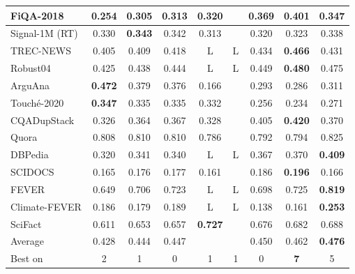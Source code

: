 \documentclass{article}
\begin{document}
\begin{table*}[t!]
{\begin{tabular}{l | c | c c | c c c c | c }
    FiQA-2018 & 0.254 
    & 0.305 & 0.313
    & 0.320 & & 0.369 & \textbf{0.401}
    & 0.347 \\ \midrule
   
    Signal-1M (RT) & 0.330
    & \textbf{0.343} & 0.342
    & 0.313 &  & 0.320 & 0.323
    & 0.338 \\ \midrule
    
    TREC-NEWS & 0.405
    & 0.409 & 0.418
    & L & L & 0.434 & \textbf{0.466}
    & 0.431 \\
    
    Robust04 & 0.425
    & 0.438 & 0.444
    & L & L & 0.449 & \textbf{0.480}
    & 0.475 \\ \midrule
    
    ArguAna & \textbf{0.472}
    & 0.379 & 0.376
    & 0.166 & & 0.293 & 0.286
    & 0.311 \\  
    
    Touché-2020 & \textbf{0.347}
    & 0.335 & 0.335
    & 0.332 & & 0.256 & 0.234
    & 0.271 \\ \midrule 
    
    CQADupStack & 0.326 
    & 0.364 & 0.367
    & 0.328 & & 0.405 & \textbf{0.420}
    & 0.370 \\
   
    Quora & 0.808
    & 0.810 & 0.810
    & 0.786 & & 0.792 & 0.794
    & 0.825 \\ \midrule
    
    DBPedia & 0.320
    & 0.341 & 0.340
    & L & L & 0.367 & 0.370
    & \textbf{0.409} \\ \midrule
   
    SCIDOCS & 0.165
    & 0.176 & 0.177
    & 0.161 & & 0.186 & \textbf{0.196}
    & 0.166 \\ \midrule
   
    FEVER & 0.649 
    & 0.706 & 0.723
    & L & L & 0.698 & 0.725
    & \textbf{0.819} \\ 
    
    Climate-FEVER & 0.186
    & 0.179 & 0.189
    & L & L & 0.138 & 0.161
    & \textbf{0.253}\\ 
    
    SciFact & 0.611
    & 0.653 & 0.657
    & \textbf{0.727} & & 0.676 & 0.682
    & 0.688 \\ \midrule
    
    Average & 0.428
    & 0.444 & 0.447
    & & & 0.450 & 0.462
    & \textbf{0.476}\\
    
    Best on & 2
    & 1 & 0
    & 1 & 1 & 0 & \textbf{7}
    & 5\\
   

\end{tabular}}
\end{table*}
\end{document}
